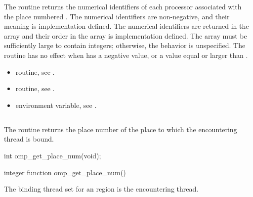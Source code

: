 \effect
The  routine returns the numerical
identifiers of each processor associated with the place numbered
. The numerical identifiers are non-negative, and
their meaning is implementation defined.  The numerical identifiers
are returned in the array  and their order in the array is
implementation defined. The array must be sufficiently large to contain
\code{)} integers;
otherwise, the behavior is unspecified.  The routine has no effect when
 has a negative value, or a value equal or larger
than .

\crossreferences
\begin{itemize}
\item {} routine, see
.

\item {} routine, see
.

\item {} environment variable, see
.
\end{itemize}




\subsection{}
\label{subsec:omp_get_place_num}

\summary
The  routine returns the place number of the place to which the encountering thread is bound.

\format
\begin{ccppspecific}
\begin{ompcFunction}
int omp_get_place_num(void);
\end{ompcFunction}
\end{ccppspecific}

\begin{fortranspecific}
\begin{ompfFunction}
integer function omp_get_place_num()
\end{ompfFunction}
\end{fortranspecific}

\binding
The binding thread set for an  region is the encountering thread.

